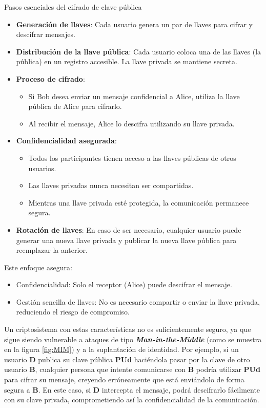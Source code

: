 Pasos esenciales del cifrado de clave pública
\begin{itemize}
  \item \textbf{Generación de llaves}: Cada usuario genera un par de llaves para cifrar y descifrar mensajes.
  \item \textbf{Distribución de la llave pública}: Cada usuario coloca una de las llaves (la pública) en un registro accesible. La llave privada se mantiene secreta.
  \item \textbf{Proceso de cifrado}:
  \begin{itemize}
    \item Si Bob desea enviar un mensaje confidencial a Alice, utiliza la llave pública de Alice para cifrarlo.
    \item Al recibir el mensaje, Alice lo descifra utilizando su llave privada.
  \end{itemize}  
  \item \textbf{Confidencialidad asegurada}:
  \begin{itemize}
    \item Todos los participantes tienen acceso a las llaves públicas de otros usuarios.
    \item Las llaves privadas nunca necesitan ser compartidas.
    \item Mientras una llave privada esté protegida, la comunicación permanece segura.
  \end{itemize}  
  \item \textbf{Rotación de llaves}: En caso de ser necesario, cualquier usuario puede generar una nueva llave privada y publicar la nueva llave pública para reemplazar la anterior.
\end{itemize}  
Este enfoque asegura:
\begin{itemize}
  \item Confidencialidad: Solo el receptor (Alice) puede descifrar el mensaje.
  \item Gestión sencilla de llaves: No es necesario compartir o enviar la llave privada, reduciendo el riesgo de compromiso.
\end{itemize}

Un criptosistema con estas características no es suficientemente seguro, ya que sigue siendo vulnerable a ataques de tipo \textit{\textbf{Man-in-the-Middle}} (como se muestra en la figura \ref{fig:MIM}) y a la suplantación de identidad. Por ejemplo, si un usuario \textbf{D} publica su clave pública \textbf{PUd} haciéndola pasar por la clave de otro usuario \textbf{B}, cualquier persona que intente comunicarse con \textbf{B} podría utilizar \textbf{PUd} para cifrar su mensaje, creyendo erróneamente que está enviándolo de forma segura a \textbf{B}. En este caso, si \textbf{D} intercepta el mensaje, podrá descifrarlo fácilmente con su clave privada, comprometiendo así la confidencialidad de la comunicación.

